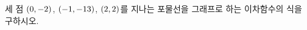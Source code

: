 세 점 $(0{,}\mkern3mu\mathopen{}-2)$, $(-1{,}\mkern3mu\mathopen{}-13)$, $(2{,}\mkern3mu\mathopen{}2)$를 지나는 포물선을 그래프로 하는 이차함수의 식을 구하시오.
